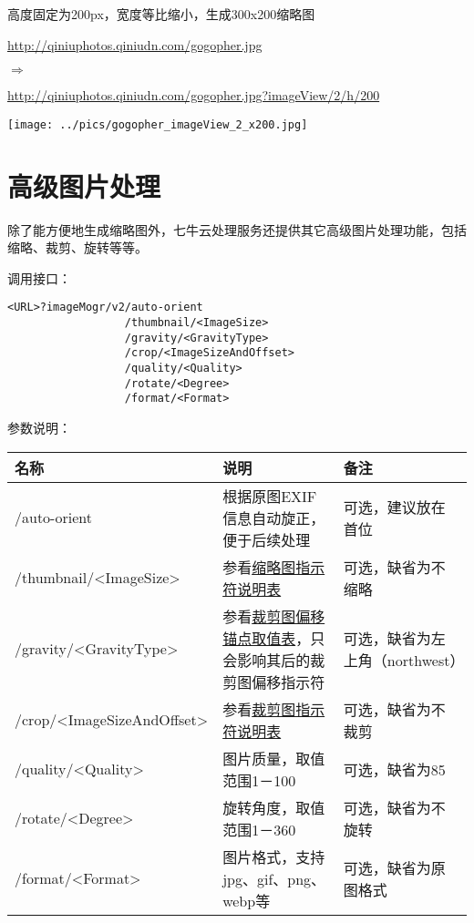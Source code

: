 \documentclass[11pt, oneside]{book}
\newcommand{\qpar}[1]{
\vspace{0.25em}
\noindent
#1\par
\vspace{0.25em}
}
\newcommand{\qurl}[1]{\url{#1}}
\newcommand{\qtable}[1]{\footnotesize\vspace{0.5em}#1\vspace{0.5em}\normalsize}
\begin{document}
\begin{CJK*}{UTF8}{song}
\begin{sample}
  \caption{高度固定为200px，宽度等比缩小，生成300x200缩略图}
    \qpar{\qurl{http://qiniuphotos.qiniudn.com/gogopher.jpg}}
    \qpar{$\Rightarrow$}
    \qpar{\qurl{http://qiniuphotos.qiniudn.com/gogopher.jpg?imageView/2/h/200}}

    \begin{center}
      \texttt{[image: ../pics/gogopher\_imageView\_2\_x200.jpg]}
    \end{center}
  \label{imageView-2-x200}
\end{sample}

\clearpage

\section{高级图片处理}

\qpar{除了能方便地生成缩略图外，七牛云处理服务还提供其它高级图片处理功能，包括缩略、裁剪、旋转等等。}
\qpar{调用接口：}
\begin{lstlisting}[basicstyle=\ttfamily\footnotesize]
<URL>?imageMogr/v2/auto-orient
                  /thumbnail/<ImageSize>
                  /gravity/<GravityType>
                  /crop/<ImageSizeAndOffset>
                  /quality/<Quality>
                  /rotate/<Degree>
                  /format/<Format>
\end{lstlisting}

\qpar{参数说明：}
\qtable{
\def\arraystretch{2}
\begin{tabular}{|l|p{13em}|p{10em}|}
\hline
名称 & 说明 & 备注\\
\hline
/auto-orient & 根据原图EXIF信息自动旋正，便于后续处理 & 可选，建议放在首位 \\
\hline
/thumbnail/\textless ImageSize\textgreater & 参看\hyperref[thumbnail-spec]{缩略图指示符说明表} & 可选，缺省为不缩略 \\
\hline
/gravity/\textless GravityType\textgreater & 参看\hyperref[offset-anchor-spec]{裁剪图偏移锚点取值表}，只会影响其后的裁剪图偏移指示符 & 可选，缺省为左上角（northwest） \\
\hline
/crop/\textless ImageSizeAndOffset\textgreater & 参看\hyperref[crop-spec]{裁剪图指示符说明表} & 可选，缺省为不裁剪 \\
\hline
/quality/\textless Quality\textgreater & 图片质量，取值范围1－100 & 可选，缺省为85 \\
\hline
/rotate/\textless Degree\textgreater & 旋转角度，取值范围1－360 & 可选，缺省为不旋转 \\
\hline
/format/\textless Format\textgreater & 图片格式，支持jpg、gif、png、webp等 & 可选，缺省为原图格式 \\
\hline
\end{tabular}
}


\end{CJK*}
\end{document}
